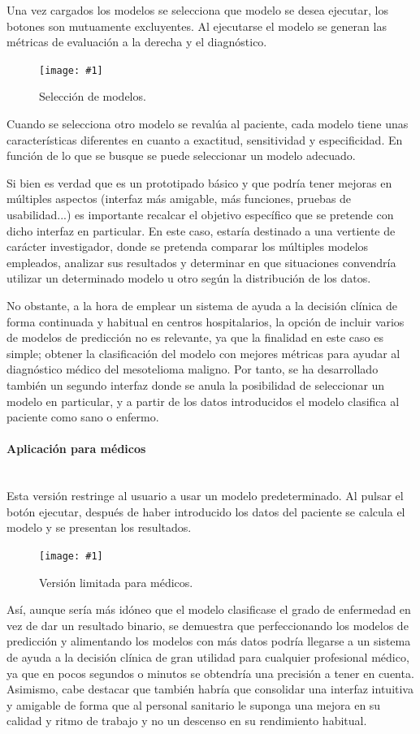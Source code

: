 \documentclass{article}
\newcommand{\incpng}[2]{
\begin{figure}[h]
\centering
\texttt{[image: \#1]}
\caption{#2}
\end{figure}
}
\newcommand{\subsubsubsection}[1]{\paragraph{#1}\mbox{}\\}
\begin{document}
Una vez cargados  los  modelos	se  selecciona	que  modelo  se  desea
ejecutar, los botones son mutuamente excluyentes.   Al	ejecutarse  el
modelo se generan las  métricas  de  evaluación  a  la	derecha  y  el
diagnóstico.

\incpng{../images/s6.png} {Selección de modelos.}

Cuando se selecciona otro modelo se revalúa al paciente,  cada	modelo
tiene  unas  características  diferentes  en   cuanto	a   exactitud,
sensitividad y especificidad.  En función de lo que se busque se puede
seleccionar un modelo adecuado.

Si bien es verdad que es un prototipado  básico  y  que  podría  tener
mejoras en múltiples aspectos (interfaz más amigable,  más  funciones,
pruebas  de  usabilidad...)  es  importante   recalcar	 el   objetivo
específico que se pretende con dicho interfaz en particular.  En  este
caso, estaría destinado a  una	vertiente  de  carácter  investigador,
donde se pretenda comparar los múltiples modelos  empleados,  analizar
sus resultados y determinar en que situaciones convendría utilizar  un
determinado  modelo  u	otro  según  la  distribución  de  los	datos.

No obstante, a la hora de emplear un sistema de ayuda  a  la  decisión
clínica de forma continuada y habitual en  centros  hospitalarios,  la
opción de incluir varios de modelos de predicción no es relevante,  ya
que la finalidad en este caso es simple; obtener la clasificación  del
modelo con mejores métricas para  ayudar  al  diagnóstico  médico  del
mesotelioma maligno.  Por tanto, se ha desarrollado también un segundo
interfaz donde se anula la posibilidad de  seleccionar	un  modelo  en
particular, y a partir de los datos introducidos el  modelo  clasifica
al paciente como sano o enfermo.

\subsubsubsection{Aplicación para médicos}

Esta versión restringe al usuario a usar un modelo predeterminado.
Al pulsar el botón ejecutar, después de haber introducido los datos del
paciente se calcula el modelo y se presentan los resultados.

\incpng{../images/s8.png} {Versión limitada para médicos.}


Así, aunque sería más idóneo que el modelo  clasificase  el  grado  de
enfermedad en vez de  dar  un  resultado  binario,  se	demuestra  que
perfeccionando los modelos de predicción y alimentando los modelos con
más datos podría llegarse a un sistema de ayuda a la decisión  clínica
de gran utilidad para cualquier profesional médico, ya	que  en  pocos
segundos o minutos se obtendría  una  precisión  a  tener  en  cuenta.
Asimismo, cabe destacar que también habría que consolidar una interfaz
intuitiva y amigable de forma que al personal sanitario le suponga una
mejora en su calidad y ritmo  de  trabajo  y  no  un  descenso	en  su
rendimiento habitual.
\end{document}
